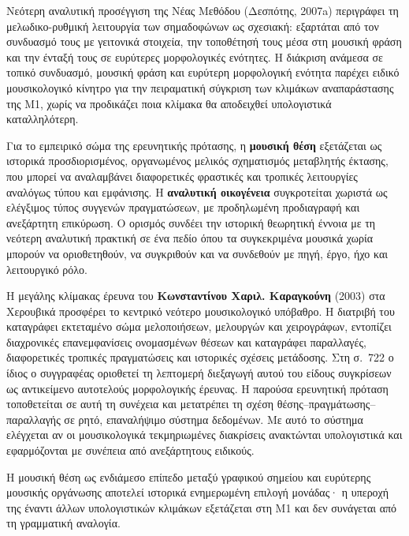 \documentclass[11pt,a4paper]{article}
\begin{document}
Νεότερη αναλυτική προσέγγιση της Νέας Μεθόδου (Δεσπότης, 2007a) περιγράφει τη μελωδικο-ρυθμική λειτουργία των σημαδοφώνων ως σχεσιακή: εξαρτάται από τον συνδυασμό τους με γειτονικά στοιχεία, την τοποθέτησή τους μέσα στη μουσική φράση και την ένταξή τους σε ευρύτερες μορφολογικές ενότητες. Η διάκριση ανάμεσα σε τοπικό συνδυασμό, μουσική φράση και ευρύτερη μορφολογική ενότητα παρέχει ειδικό μουσικολογικό κίνητρο για την πειραματική σύγκριση των κλιμάκων αναπαράστασης της M1, χωρίς να προδικάζει ποια κλίμακα θα αποδειχθεί υπολογιστικά καταλληλότερη.

Για το εμπειρικό σώμα της ερευνητικής πρότασης, η \textbf{μουσική θέση} εξετάζεται ως ιστορικά προσδιορισμένος, οργανωμένος μελικός σχηματισμός μεταβλητής έκτασης, που μπορεί να αναλαμβάνει διαφορετικές φραστικές και τροπικές λειτουργίες αναλόγως τύπου και εμφάνισης. Η \textbf{αναλυτική οικογένεια} συγκροτείται χωριστά ως ελέγξιμος τύπος συγγενών πραγματώσεων, με προδηλωμένη προδιαγραφή και ανεξάρτητη επικύρωση. Ο ορισμός συνδέει την ιστορική θεωρητική έννοια με τη νεότερη αναλυτική πρακτική σε ένα πεδίο όπου τα συγκεκριμένα μουσικά χωρία μπορούν να οριοθετηθούν, να συγκριθούν και να συνδεθούν με πηγή, έργο, ήχο και λειτουργικό ρόλο.

Η μεγάλης κλίμακας έρευνα του \textbf{Κωνσταντίνου Χαριλ. Καραγκούνη} (2003) στα Χερουβικά προσφέρει το κεντρικό νεότερο μουσικολογικό υπόβαθρο. Η διατριβή του καταγράφει εκτεταμένο σώμα μελοποιήσεων, μελουργών και χειρογράφων, εντοπίζει διαχρονικές επανεμφανίσεις ονομασμένων θέσεων και καταγράφει παραλλαγές, διαφορετικές τροπικές πραγματώσεις και ιστορικές σχέσεις μετάδοσης. Στη σ.~722 ο ίδιος ο συγγραφέας οριοθετεί τη λεπτομερή διεξαγωγή αυτού του είδους συγκρίσεων ως αντικείμενο αυτοτελούς μορφολογικής έρευνας. Η παρούσα ερευνητική πρόταση τοποθετείται σε αυτή τη συνέχεια και μετατρέπει τη σχέση θέσης--πραγμάτωσης--παραλλαγής σε ρητό, επαναλήψιμο σύστημα δεδομένων. Με αυτό το σύστημα ελέγχεται αν οι μουσικολογικά τεκμηριωμένες διακρίσεις ανακτώνται υπολογιστικά και εφαρμόζονται με συνέπεια από ανεξάρτητους ειδικούς.

Η μουσική θέση ως ενδιάμεσο επίπεδο μεταξύ γραφικού σημείου και ευρύτερης μουσικής οργάνωσης αποτελεί ιστορικά ενημερωμένη επιλογή μονάδας· η υπεροχή της έναντι άλλων υπολογιστικών κλιμάκων εξετάζεται στη M1 και δεν συνάγεται από τη γραμματική αναλογία.
\end{document}
